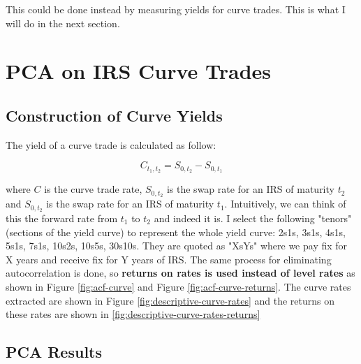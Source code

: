 \documentclass[11pt]{scrreprt}
\begin{document}
This could be done instead by measuring yields for curve trades. This is what I will do in the next section.

\chapter{PCA on IRS Curve Trades}

\section{Construction of Curve Yields}

The yield of a curve trade is calculated as follow:

\[C_{t_1, t_2} = S_{0, t_2} - S_{0, t_1}\]

where $C$ is the curve trade rate, $S_{0,t_2}$ is the swap rate for an IRS of maturity $t_2$ and $S_{0, t_2}$ is the swap rate for an IRS of maturity $t_1$. Intuitively, we can think of this the forward rate from $t_1$ to $t_2$ and indeed it is. I select the following "tenors" (sections of the yield curve) to represent the whole yield curve: 2s1s, 3s1s, 4s1s, 5s1s, 7s1s, 10s2s, 10s5s, 30s10s. They are quoted as "XsYs" where we pay fix for X years and receive fix for Y years of IRS. The same process for eliminating autocorrelation is done, so \textbf{returns on rates is used instead of level rates} as shown in Figure \ref{fig:acf-curve} and Figure \ref{fig:acf-curve-returns}. The curve rates extracted are shown in Figure \ref{fig:descriptive-curve-rates} and the returns on these rates are shown in \ref{fig:descriptive-curve-rates-returns}

\section{PCA Results}
\end{document}
